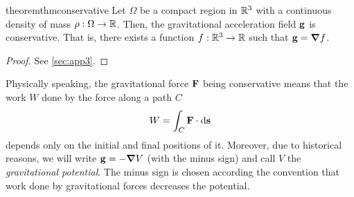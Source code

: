 \documentclass[../main.tex]{subfiles}
\begin{document}
\begin{restatable}{theorem}{thmconservative}\label{thm:conservative}
  Let $\Omega$ be a compact region in $\mathbb{R}^3$ with a continuous density of mass $\rho:\Omega\to\mathbb{R}$. Then, the gravitational acceleration field $\boldsymbol{\mathrm{g}}$ is conservative. That is, there exists a function $f:\mathbb{R}^3\rightarrow\mathbb{R}$ such that $\boldsymbol{\mathrm{g}}=\grad f$.
\end{restatable}
\begin{proof}
  See \cref{sec:app3}.
\end{proof}
Physically speaking, the gravitational force $\boldsymbol{\mathrm{F}}$ being conservative means that the work $W$ done by the force along a path $C$
\begin{equation}
  W=\int_C\boldsymbol{\mathrm{F}}\cdot\dd{\boldsymbol{\mathrm{s}}}
\end{equation}
depends only on the initial and final positions of it. Moreover, due to historical reasons, we will write $\boldsymbol{\mathrm{g}}=-\grad V$ (with the minus sign) and call $V$ the \emph{gravitational potential}. The minus sign is chosen according the convention that work done by gravitational forces decreases the potential.
\end{document}
